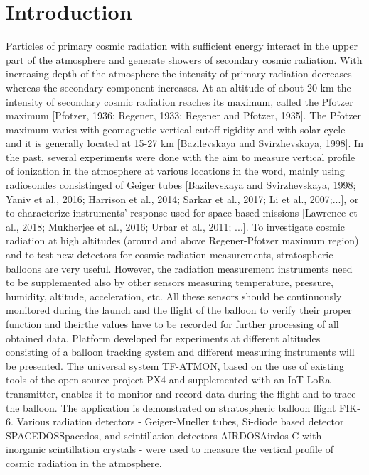 \documentclass{Rpd}
\begin{document}
\maketitle


\section{Introduction}

Particles of primary cosmic radiation with sufficient energy interact in the upper part of the atmosphere and generate showers of secondary cosmic radiation. With increasing depth of the atmosphere the intensity of primary radiation decreases whereas the secondary component increases. At an altitude of about 20 km the intensity of secondary cosmic radiation reaches its maximum, called the Pfotzer maximum [Pfotzer, 1936; Regener, 1933; Regener and Pfotzer, 1935]. The Pfotzer maximum varies with geomagnetic vertical cutoff rigidity and with solar cycle and it is generally located at 15-27 km [Bazilevskaya and Svirzhevskaya, 1998].
In the past, several experiments were done with the aim to measure vertical profile of ionization in the atmosphere at various locations in the word, mainly using radiosondes consistinged of Geiger tubes [Bazilevskaya and Svirzhevskaya, 1998; Yaniv et al., 2016; Harrison et al., 2014; Sarkar et al., 2017; Li et al., 2007;...], or to characterize instruments’ response used for space-based missions [Lawrence et al., 2018; Mukherjee et al., 2016; Urbar et al., 2011; ...].
To investigate cosmic radiation at high altitudes (around and above Regener-Pfotzer maximum region) and to test new detectors for cosmic radiation measurements, stratospheric balloons are very useful.
However, the radiation measurement instruments need to be supplemented also by other sensors measuring temperature, pressure, humidity, altitude, acceleration, etc.  All these sensors should be continuously monitored during the launch and the flight of the balloon to verify their proper function and theirthe values have to be recorded for further processing of all obtained data.
Platform developed for experiments at different altitudes consisting of a balloon tracking system and different measuring instruments will be presented. The universal system TF-ATMON, based on the use of existing tools of the open-source project PX4 and supplemented with an IoT LoRa transmitter, enables it to monitor and record data during the flight and to trace the balloon. The application is demonstrated on stratospheric balloon flight FIK-6. Various radiation detectors - Geiger-Mueller tubes, Si-diode based detector SPACEDOSSpacedos, and scintillation detectors AIRDOSAirdos-C with inorganic scintillation crystals - were used to measure the vertical profile of cosmic radiation in the atmosphere.
\end{document}
